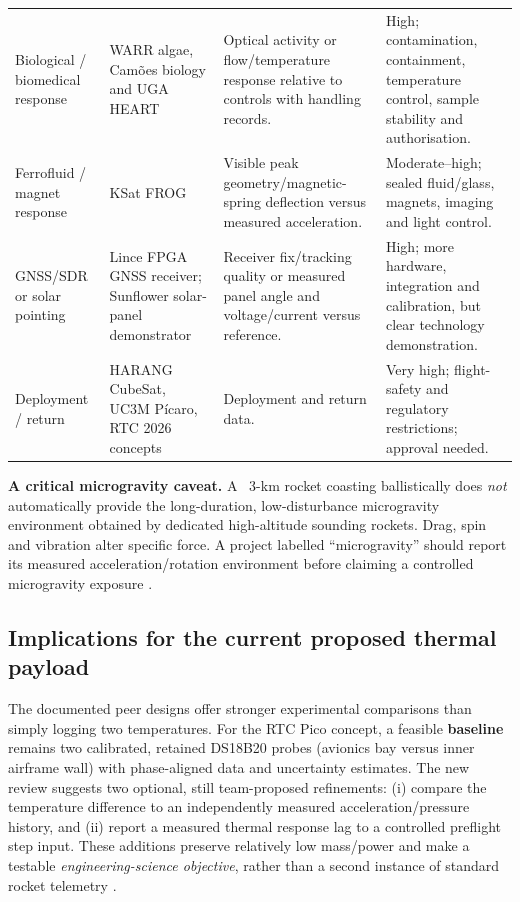 \documentclass[10pt,a4paper]{article}
\begin{document}
\begin{longtable}{@{}L{31mm}L{37mm}L{41mm}L{34mm}@{}}
Biological / biomedical response & WARR algae, Cam\~oes biology and UGA HEART \cite{warr2024spacelabs,red2023camoes,uga2026capstone} & Optical activity or flow/temperature response relative to controls with handling records. & High; contamination, containment, temperature control, sample stability and authorisation.\\
Ferrofluid / magnet response & KSat FROG \cite{ksat2025frog} & Visible peak geometry/magnetic-spring deflection versus measured acceleration. & Moderate--high; sealed fluid/glass, magnets, imaging and light control.\\
GNSS/SDR or solar pointing & Lince FPGA GNSS receiver; Sunflower solar-panel demonstrator \cite{star2023lince,ucf2026odysseus} & Receiver fix/tracking quality or measured panel angle and voltage/current versus reference. & High; more hardware, integration and calibration, but clear technology demonstration.\\
Deployment / return & HARANG CubeSat, UC3M P\'icaro, RTC 2026 concepts \cite{moon2023harang,star2024picaro,tasa2026report} & Deployment and return data. & Very high; flight-safety and regulatory restrictions; approval needed.\\
\end{longtable}
\normalsize

\textbf{A critical microgravity caveat.} A ~3-km rocket coasting ballistically does \emph{not} automatically provide the long-duration, low-disturbance microgravity environment obtained by dedicated high-altitude sounding rockets. Drag, spin and vibration alter specific force. A project labelled ``microgravity'' should report its measured acceleration/rotation environment before claiming a controlled microgravity exposure \cite{moura2024mgx,umd2022terpulence}.

\subsection{Implications for the current proposed thermal payload}
The documented peer designs offer stronger experimental comparisons than simply logging two temperatures. For the RTC Pico concept, a feasible \textbf{baseline} remains two calibrated, retained DS18B20 probes (avionics bay versus inner airframe wall) with phase-aligned data and uncertainty estimates. The new review suggests two optional, still team-proposed refinements: (i) compare the temperature difference to an independently measured acceleration/pressure history, and (ii) report a measured thermal response lag to a controlled preflight step input. These additions preserve relatively low mass/power and make a testable \emph{engineering-science objective}, rather than a second instance of standard rocket telemetry \cite{ukcansat2024,rtc2027rules}.
\end{document}
